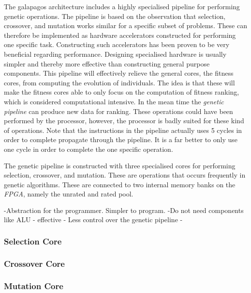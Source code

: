 The galapagos architecture includes a highly specialised pipeline for performing genetic operations. The pipeline is based on the observation that selection, crossover, and mutation works similar for a specific subset of problems. These can therefore be implemented as hardware accelerators constructed for performing one specific task. Constructing such accelerators has been proven to be very beneficial regarding performance. Designing specialised hardware is usually simpler and thereby more effective than constructing general purpose components. This pipeline will effectively relieve the general cores, the fitness cores, from computing the evolution of individuals. The idea is that these will make the fitness cores able to only focus on the computation of fitness ranking, which is considered computational intensive. In the mean time the \emph{genetic pipeline} can produce new data for ranking. These operations could have been performed by the processor, however, the processor is badly suited for these kind of operations. Note that the instructions in the pipeline actually uses 5 cycles in order to complete propagate through the pipeline. It is a far better to only use one cycle in order to complete the one specific operation.  

The genetic pipeline is constructed with three specialised cores for performing selection, crossover, and mutation. These are operations that occurs frequently in genetic algorithms. These are connected to two internal memory banks on the \emph{FPGA}, namely the unrated and rated pool.


-Abstraction for the programmer. Simpler to program.
-Do not need components like ALU
- effective 
- Less control over the genetic pipeline
- 



\subsubsection {Selection Core} \label{fpga:selection:ss:selection_core}
     \label{fpga:subsection:selection_core}

\subsubsection{Crossover Core} \label{fpga:crossover:ss:crossover_core}
     \label{fpga:subsection:crossover_core}

\subsubsection{Mutation Core}\label{fpga:mutation:ss:mutation_core}
     \label{fpga:subsection:mutation_core}


